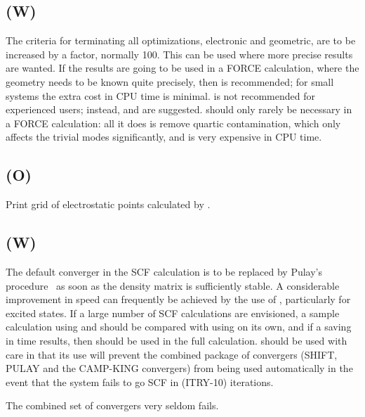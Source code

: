 \subsection*{ (W)}
        The criteria  for  terminating  all  optimizations,  electronic  and
   geometric,  are  to be increased by a factor, normally 100.  This can be
   used where more precise results are wanted.  If the results are going  to
   be  used  in  a  FORCE  calculation, where the geometry needs to be known
   quite precisely, then  is recommended; for small systems the extra
   cost  in CPU time is minimal.   is not recommended for experienced
   users; instead,  and  are suggested.
     should
   only   rarely  be  necessary in a FORCE calculation:  all it does is
remove quartic contamination, which only affects the trivial modes
   significantly, and is very expensive in CPU time.

\subsection*{ (O)}
Print grid of electrostatic points calculated by .

\subsection*{ (W)}
        The default converger in the SCF calculation is to  be  replaced  by
   Pulay's  procedure~\cite{diis}  as soon as the density matrix
   is sufficiently stable.
   A considerable improvement in speed can frequently  be achieved by
the use of  ,
particularly for excited states.
   If a large number of SCF calculations are envisioned, a sample calculation
   using  and  should be compared with using 
on its  own,  and
   if  a  saving  in  time  results,  then   should be used in the full
   calculation.   should be used with care in that its use will prevent
   the  combined  package  of  convergers  (SHIFT,  PULAY  and the CAMP-KING
   convergers) from being used automatically in the event  that  the  system
   fails to go SCF in (ITRY-10) iterations.

        The combined set of convergers very seldom fails.


